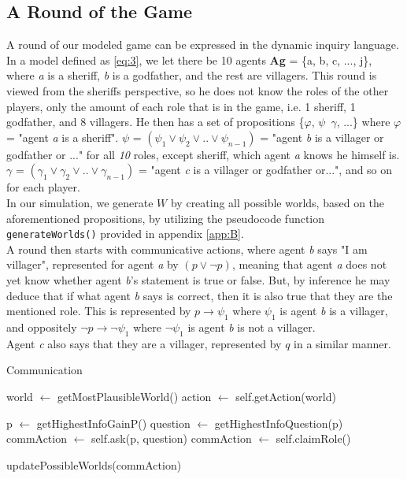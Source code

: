 \subsection{A Round of the Game}\label{ARoundOfTheGame}
A round of our modeled game can be expressed in the dynamic inquiry language.
In a model defined as \cref{eq:3}, we let there be 10 agents \textbf{Ag} = \{a, 
b, c, ..., j\},
where \textit{a} is a sheriff, \textit{b} is a godfather, and the rest are 
villagers. This round is viewed from the sheriffs perspective, so he does not
know the roles of the other players, only the amount of each role that is in 
the game, i.e. 1 sheriff, 1 godfather, and 8 villagers. He then has a set of 
propositions \{$\varphi$, $\psi$\, $\gamma$, ...\} where
$\varphi$ = "agent \textit{a} is a sheriff". $\psi$ = $(\psi_1 \lor \psi_2 \lor 
.. \lor \psi_{n-1})$ = "agent \textit{b} is a villager or godfather or ..." for 
all \textit{10} roles, except sheriff, which agent \textit{a} knows he himself 
is. $\gamma$ = $(\gamma_1 \lor \gamma_2 \lor .. \lor \gamma_{n-1}) $ = "agent 
\textit{c} is a villager or godfather or...", and so on for each player. \\ 
In our simulation, we generate $W$ by creating all possible worlds, based on 
the aforementioned propositions, by utilizing the pseudocode function 
\lstinline{generateWorlds()} provided in appendix \ref{app:B}. \\ 
A round then starts with communicative actions, where agent \textit{b} says "I 
am villager", represented for agent \textit{a} by $(p \lor \neg p)$, meaning 
that agent \textit{a} does not yet know whether agent \textit{b}'s statement is 
true or false. But, by inference he may deduce that if what agent \textit{b} 
says is correct, then it is also true that they are the mentioned role. This is 
represented by $p \rightarrow \psi_1$ where $\psi_1$ is agent \textit{b} is a 
villager, and oppositely $\neg p \rightarrow \neg \psi_1$ where $\neg \psi_1$ 
is agent \textit{b} is not a villager. \\
Agent \textit{c} also says that they are a villager, represented by $q$ in a
similar manner.

\begin{algorithm}
	\caption{Communication}
	\begin{algorithmic}[1]
		\State world $\gets$ getMostPlausibleWorld()
		\State action $\gets$ self.getAction(world)

		\State p $\gets$ getHighestInfoGainP()
		\State question $\gets$ getHighestInfoQuestion(p)
		\State commAction $\gets$ self.ask(p, question)
		\State commAction $\gets$ self.claimRole()
		\EndIf

		\State updatePossibleWorlds(commAction)
		\EndFunction
	\end{algorithmic}
\end{algorithm}\label{lst:communicate}

